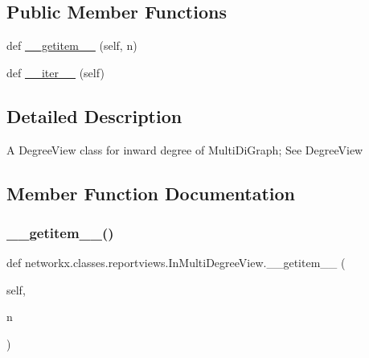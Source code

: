\subsection*{Public Member Functions}
\begin{DoxyCompactItemize}
\item 
def \hyperlink{classnetworkx_1_1classes_1_1reportviews_1_1InMultiDegreeView_a31b9c05560aa4d323f94cc0814fa79b4}{\+\_\+\+\_\+getitem\+\_\+\+\_\+} (self, n)
\item 
def \hyperlink{classnetworkx_1_1classes_1_1reportviews_1_1InMultiDegreeView_a887bf851350a7d15ae6424f439abc36b}{\+\_\+\+\_\+iter\+\_\+\+\_\+} (self)
\end{DoxyCompactItemize}


\subsection{Detailed Description}
\begin{DoxyVerb}A DegreeView class for inward degree of MultiDiGraph; See DegreeView\end{DoxyVerb}
 

\subsection{Member Function Documentation}
\mbox{\label{classnetworkx_1_1classes_1_1reportviews_1_1InMultiDegreeView_a31b9c05560aa4d323f94cc0814fa79b4}} 
\subsubsection{\texorpdfstring{\+\_\+\+\_\+getitem\+\_\+\+\_\+()}{\_\_getitem\_\_()}}
{\footnotesize\ttfamily def networkx.\+classes.\+reportviews.\+In\+Multi\+Degree\+View.\+\_\+\+\_\+getitem\+\_\+\+\_\+ (\begin{DoxyParamCaption}\item[{}]{self,  }\item[{}]{n }\end{DoxyParamCaption})}

